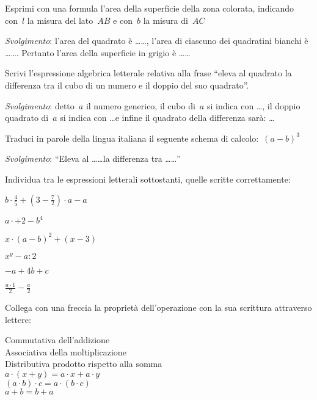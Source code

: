 \begin{multicols}{2}
\begin{esercizio}
\label{ese:8.1}
Esprimi con una formula l'area della superficie della zona colorata,
indicando con~$l$ la misura del lato~$AB$ e
con~$b$ la misura di~$AC$

\emph{Svolgimento}: l'area del quadrato è \ldots\ldots,
l'area di ciascuno dei quadratini bianchi è \ldots\ldots. 
Pertanto l'area della superficie in
grigio è \ldots\ldots
\end{esercizio}

\begin{esercizio}
\label{ese:8.2}
Scrivi l'espressione algebrica letterale relativa alla frase ``eleva al 
quadrato la differenza tra il cubo di un numero e il doppio del suo quadrato''.

\emph{Svolgimento}: detto~$a$ il numero generico, il cubo di~$a$ si indica 
con \ldots, il doppio quadrato di~$a$ si indica con \ldots e infine
il quadrato della differenza sarà: \ldots
\end{esercizio}

\begin{esercizio}
\label{ese:8.3}
Traduci in parole della lingua italiana il seguente schema di 
calcolo:~$(a-b)^{3}$

\emph{Svolgimento}: ``Eleva al \ldots\ldots la differenza tra \ldots\ldots''
\end{esercizio}

\begin{esercizio}
 \label{ese:8.4}
Individua tra le espressioni letterali sottostanti, quelle scritte 
correttamente:
\begin{enumeratea}
\spazielenx
 \item $b\cdot {\frac{4}{5}}+\left(3-\frac{7}{2}\right)\cdot a-a$
 \item $a\cdot +2-b^{4}$
 \item $x\cdot (a-b)^{2}+(x-3)$
 \item $x^{y}-a:2$
 \item $-a+4b+c$
 \item $\frac{a\cdot 1}{2}-\frac{a}{2}$
\end{enumeratea}
\end{esercizio}
\end{multicols}

\begin{esercizio}
\label{ese:8.5}
 Collega con una freccia la proprietà dell'operazione con la sua scrittura 
 attraverso lettere:
 \begin{multicols}{2}
 \noindent
 Commutativa dell'addizione\\
 Associativa della moltiplicazione\\
 Distributiva prodotto rispetto alla somma\\
 $a\cdot (x+y)=a\cdot x+a\cdot y$\\
 $\left(a\cdot b\right)\cdot c=a\cdot \left(b\cdot c\right)$\\
 ${a+b=b+a}$
 \end{multicols}
\end{esercizio}

